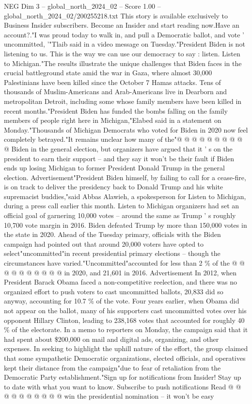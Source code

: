 \begin{textsample}{NEG Dim 3 – global\_north\_2024\_02 – Score 1.00 – global\_north\_2024\_02/200255218.txt}  \label{ex:f3_neg_202}
This story is available exclusively to Business Insider subscribers.
Become an Insider and start reading now.Have an account?."I was proud today to walk in, and pull a Democratic ballot, and vote ' uncommitted, '"Tlaib said in a video message on Tuesday."President Biden is not listening to us.
This is the way we can use our democracy to say : listen.
Listen to Michigan."The results illustrate the unique challenges that Biden faces in the crucial battleground state amid the war in Gaza, where almost 30,000 Palestinians have been killed since the October 7 Hamas attacks.
Tens of thousands of Muslim-Americans and Arab-Americans live in Dearborn and metropolitan Detroit, including some whose family members have been killed in recent months."President Biden has funded the bombs falling on the family members of people right here in Michigan,"Elabed said in a statement on Monday."Thousands of Michigan Democrats who voted for Biden in 2020 now feel completely betrayed."It remains unclear how many of the"@ @ @ @ @ @ @ @ @ @ Biden in the general election, but organizers have argued that it ' s on the president to earn their support -- and they say it won't be their fault if Biden ends up losing Michigan to former President Donald Trump in the general election.
Advertisement"President Biden himself, by failing to call for a cease-fire, is on track to deliver the presidency back to Donald Trump and his white supremacist buddies,"said Abbas Alawieh, a spokesperson for Listen to Michigan, during a press call earlier this month.
Listen to Michigan organizers had set an official goal of garnering 10,000 votes -- around the same as Trump ' s roughly 10,700 vote margin in 2016.
Biden defeated Trump by more than 150,000 votes in the state in 2020.
Ahead of the Tuesday primary, officials with the Biden campaign had pointed out that around 20,000 voters have opted to select"uncommitted"in recent presidential primary elections -- though the circumstances have varied."Uncommitted"accounted for less than 2 \% of the @ @ @ @ @ @ @ @ @ @ in 2020, and 21,601 in 2016.
Advertisement In 2012, when President Barack Obama faced a non-competitive reelection, and there was no organized effort to push voters to cast uncommitted ballots, 20,833 did so anyway, accounting for 10.7 \% of the vote.
Four years earlier, when Obama did not appear on the ballot, many of his supporters cast uncommitted votes over his opponent Hillary Clinton, leading to 238,168 votes that accounted for roughly 40 \% of the electorate.
In a memo to reporters on Monday, the campaign said that it had spent about \$200,000 on mail and digital ads, organizing, and other expenses.
In seeking to highlight the uphill nature of the effort, the group claimed that some sympathetic Democratic organizations, elected officials, and operatives kept their distance from the campaign"due to fear of retaliation from the Democratic Party establishment."Sign up for notifications from Insider!
Stay up to date with what you want to know.
Subscribe to push notifications Read @ @ @ @ @ @ @ @ @ @ win the presidential nomination -- it won't be easy

\end{textsample}

